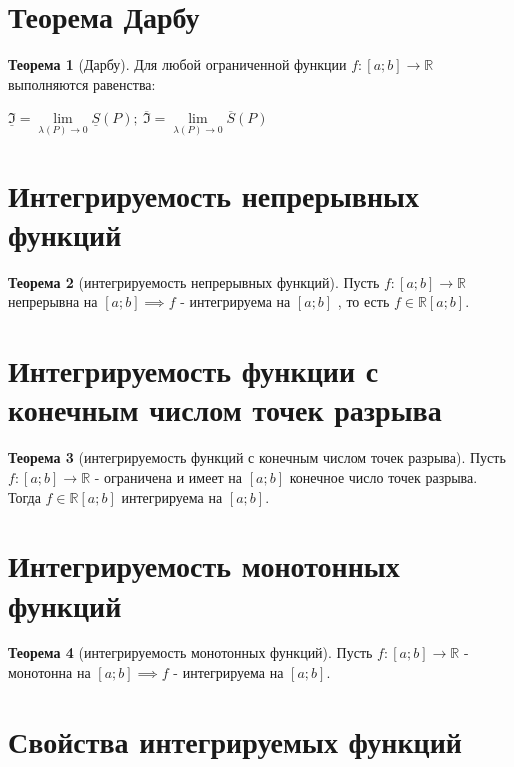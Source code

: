 \documentclass{report}
\theoremstyle{definition}
\newtheorem*{theorem}{Теорема}
\begin{document}
\section{Теорема Дарбу}

\begin{theorem}[Дарбу]
    Для любой ограниченной функции $f:[a;b]\rightarrow\mathbb{R}$ выполняются равенства:

    \begin{center}
        {\large $\underline{\mathfrak{I}} = \underset{\lambda(P)\rightarrow0}{\lim}\underline{S}(P); \ \overline{\mathfrak{I}}
                = \underset{\lambda(P)\rightarrow0}{\lim}\overline{S}(P)$}
    \end{center}
\end{theorem}

\section{Интегрируемость непрерывных функций}

\begin{theorem}[интегрируемость непрерывных функций]
    Пусть $f:[a;b]\rightarrow\mathbb{R}$ непрерывна на $[a;b]\implies f$ - интегрируема на $[a;b]$
    , то есть $f\in\mathbb{R}[a;b]$.
\end{theorem}

\section{Интегрируемость функции с конечным числом точек разрыва}

\begin{theorem}[интегрируемость функций с конечным числом точек разрыва]
    Пусть $f:[a;b]\rightarrow\mathbb{R}$ - ограничена и имеет на $[a;b]$ конечное число точек
    разрыва. Тогда $f\in\mathbb{R}[a;b]$ интегрируема на $[a;b]$.
\end{theorem}

\section{Интегрируемость монотонных функций}

\begin{theorem}[интегрируемость монотонных функций]
    Пусть $f:[a;b]\rightarrow\mathbb{R}$ - монотонна на $[a;b]\implies f$ - интегрируема на $[a;b]$.
\end{theorem}

\section{Свойства интегрируемых функций}
\end{document}
